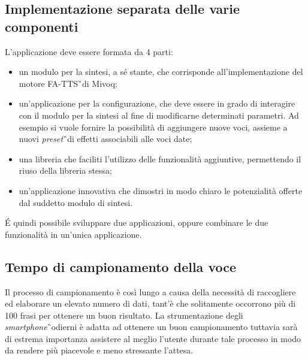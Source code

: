 \subsection{Implementazione separata delle varie componenti}
L'applicazione deve essere formata da 4 parti:
\begin{itemize}
	\item un modulo per la sintesi, a sé stante, che corrisponde 
	all'implementazione del motore FA-TTS\G\ di Mivoq;
	\item un'applicazione per la configurazione, che deve essere in grado di 
	interagire con il modulo per la sintesi al fine di modificarne determinati 
	parametri. Ad esempio si vuole fornire la possibilità di aggiungere nuove 
	voci, assieme a nuovi \textit{preset}\G\ di effetti associabili alle voci 
	date;
	\item una libreria che faciliti l'utilizzo delle funzionalità aggiuntive, 
	permettendo il riuso della libreria stessa;
	\item un'applicazione innovativa che dimostri in modo chiaro le 
	potenzialità offerte dal suddetto modulo di sintesi.
\end{itemize}
\'E quindi possibile sviluppare due applicazioni, oppure combinare le due funzionalità in 
un'unica applicazione. 

\subsection{Tempo di campionamento della voce}
Il processo di campionamento è così lungo 
a causa della necessità di raccogliere ed elaborare un elevato numero di dati, 
tant'è che solitamente occorrono più di 100 frasi per ottenere un buon 
risultato. La strumentazione degli \textit{smartphone}\G\ odierni è adatta ad ottenere un 
buon campionamento tuttavia sarà di estrema importanza  
assistere al meglio l'utente durante tale processo in modo da rendere più piacevole e meno stressante l'attesa. 


